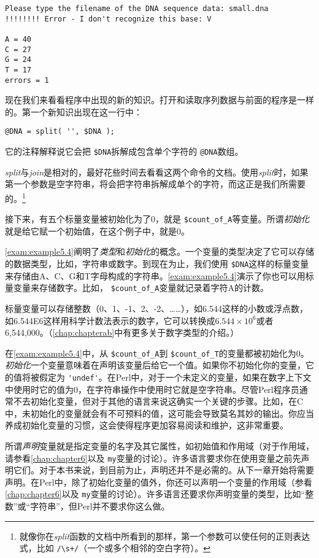\begin{lstlisting}
Please type the filename of the DNA sequence data: small.dna
!!!!!!!! Error - I don't recognize this base: V

A = 40
C = 27
G = 24
T = 17
errors = 1
\end{lstlisting}

现在我们来看看程序中出现的新的知识。打开和读取序列数据与前面的程序是一样的。第一个新知识出现在这一行中：

\begin{lstlisting}
@DNA = split( '', $DNA );
\end{lstlisting}

它的注释解释说它会把 \verb|$DNA|拆解成包含单个字符的 \verb|@DNA|数组。

\textit{split}与\textit{join}是相对的，最好花些时间去看看这两个命令的文档。使用\textit{split}时，如果第一个参数是空字符串，将会把字符串拆解成单个的字符，而这正是我们所需要的。\footnote{就像你在\textit{split}函数的文档中所看到的那样，第一个参数可以使任何的正则表达式，比如 \verb|/\s+/|（一个或多个相邻的空白字符）。}

接下来，有五个标量变量被初始化为了0，就是 \verb|$count_of_A|等变量。所谓\textit{初始化}就是给它赋一个初始值，在这个例子中，就是0。

\autoref{exam:example5.4}阐明了\textit{类型}和\textit{初始化}的概念。一个变量的类型决定了它可以存储的数据类型，比如，字符串或数字。到现在为止，我们使用 \verb|$DNA|这样的标量变量来存储由A、C、G和T字母构成的字符串。\autoref{exam:example5.4}演示了你也可以用标量变量来存储数字。比如， \verb|$count_of_A|变量就记录着字符A的计数。

标量变量可以存储整数（0、1、-1、2、-2、……），如6.544这样的小数或浮点数，如6.544E6这样用科学计数法表示的数字，它可以转换成$6.544 \times 10^6$或者6,544,000。（\autoref{chap:chapterab}中有更多关于数字类型的介绍。）

在\autoref{exam:example5.4}中，从 \verb|$count_of_A|到 \verb|$count_of_T|的变量都被初始化为0。\textit{初始化}一个变量意味着在声明该变量后给它一个值。如果你不初始化你的变量，它的值将被假定为 \verb|'undef'|。在Perl中，对于一个未定义的变量，如果在数字上下文中使用时它的值为0，在字符串操作中使用时它就是空字符串。尽管Perl程序员通常不去初始化变量，但对于其他的语言来说这确实一个关键的步骤。比如，在C中，未初始化的变量就会有不可预料的值，这可能会导致莫名其妙的输出。你应当养成初始化变量的习惯，这会使得程序更加容易阅读和维护，这非常重要。

所谓\textit{声明}变量就是指定变量的名字及其它属性，如初始值和作用域（对于作用域，请参看\autoref{chap:chapter6}以及 \verb|my|变量的讨论）。许多语言要求你在使用变量之前先声明它们。对于本书来说，到目前为止，声明还并不是必需的。从下一章开始将需要声明。在Perl中，除了初始化变量的值外，你还可以声明一个变量的作用域（参看\autoref{chap:chapter6}以及 \verb|my|变量的讨论）。许多语言还要求你声明变量的类型，比如“整数”或“字符串”，但Perl并不要求你这么做。

